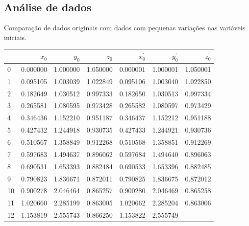 \documentclass[12pt, a4paper]{article}
\begin{document}
    \subsection{Análise de dados}
    Comparação de dados originais com dados com pequenas variações nas
    variáveis iniciais.
    \begin{table}[h!]
        \centering
        \begin{tabular}{|l|r|r|r|r|r|r|}
            \hline
               & $x_0$    & $y_0$     & $z_0$    & $x^\prime_0$ & $y^\prime_0$ &
            $z^\prime_0$
            \\
            \hline
            0  & 0.000000 & 1.000000  & 1.050000 & 0.000001     & 1.000001     &
            1.050001
            \\
            1  & 0.095105 & 1.003039  & 1.022849 & 0.095106     & 1.003040     &
            1.022850
            \\
            2  & 0.182649 & 1.030512  & 0.997333 & 0.182650     & 1.030513     &
            0.997334
            \\
            3  & 0.265581 & 1.080595  & 0.973428 & 0.265582     & 1.080597     &
            0.973429
            \\
            4  & 0.346436 & 1.152210  & 0.951187 & 0.346437     & 1.152212     &
            0.951188
            \\
            5  & 0.427432 & 1.244918  & 0.930735 & 0.427433     & 1.244921     &
            0.930736
            \\
            6  & 0.510567 & 1.358849  & 0.912268 & 0.510568     & 1.358851     &
            0.912269
            \\
            7  & 0.597683 & 1.494637  & 0.896062 & 0.597684     & 1.494640     &
            0.896063
            \\
            8  & 0.690531 & 1.653393  & 0.882484 & 0.690533     & 1.653396     &
            0.882485
            \\
            9  & 0.790823 & 1.836671  & 0.872011 & 0.790825     & 1.836675     &
            0.872012
            \\
            10 & 0.900278 & 2.046464  & 0.865257 & 0.900280     & 2.046469     &
            0.865258
            \\
            11 & 1.020660 & 2.285199  & 0.863005 & 1.020662     & 2.285204     &
            0.863006
            \\
            12 & 1.153819 & 2.555743  & 0.866250 & 1.153822     & 2.555749     &

\end{tabular}
\end{table}
\end{document}
